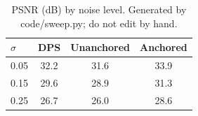 \begin{table}[t]
\caption{PSNR (dB) by noise level. Generated by code/sweep.py; do not edit by hand.}
\label{tab:psnr}
\centering
\begin{tabular}{lccc}
\toprule
$\sigma$ & DPS & Unanchored & Anchored \\
\midrule
0.05 & 32.2 & 31.6 & 33.9 \\
0.15 & 29.6 & 28.9 & 31.3 \\
0.25 & 26.7 & 26.0 & 28.6 \\
\bottomrule
\end{tabular}
\end{table}
